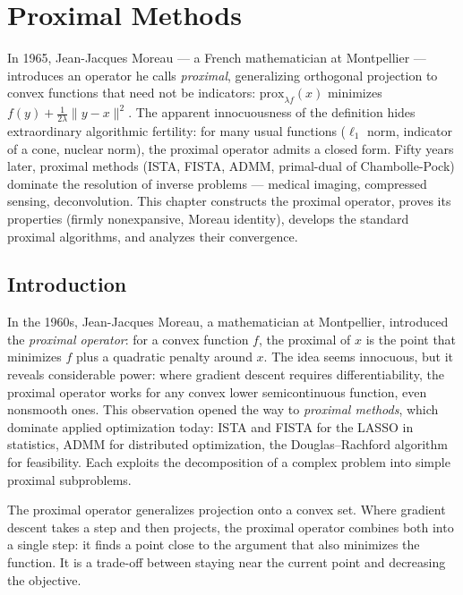 \chapter{Proximal Methods}
\label{ch:proximal}

In 1965, Jean-Jacques Moreau --- a French mathematician at Montpellier --- introduces an operator he calls \emph{proximal}, generalizing orthogonal projection to convex functions that need not be indicators: $\mathrm{prox}_{\lambda f}(x)$ minimizes $f(y) + \frac{1}{2\lambda}\|y - x\|^2$. The apparent innocuousness of the definition hides extraordinary algorithmic fertility: for many usual functions ($\ell_1$ norm, indicator of a cone, nuclear norm), the proximal operator admits a closed form. Fifty years later, proximal methods (ISTA, FISTA, ADMM, primal-dual of Chambolle-Pock) dominate the resolution of inverse problems --- medical imaging, compressed sensing, deconvolution. This chapter constructs the proximal operator, proves its properties (firmly nonexpansive, Moreau identity), develops the standard proximal algorithms, and analyzes their convergence.

\section{Introduction}

In the 1960s, Jean-Jacques Moreau, a mathematician at Montpellier, introduced the \emph{proximal operator}: for a convex function $f$, the proximal of $x$ is the point that minimizes $f$ plus a quadratic penalty around $x$. The idea seems innocuous, but it reveals considerable power: where gradient descent requires differentiability, the proximal operator works for any convex lower semicontinuous function, even nonsmooth ones. This observation opened the way to \emph{proximal methods}, which dominate applied optimization today: ISTA and FISTA for the LASSO in statistics, ADMM for distributed optimization, the Douglas--Rachford algorithm for feasibility. Each exploits the decomposition of a complex problem into simple proximal subproblems.

\begin{intuition}
The proximal operator generalizes projection onto a convex set. Where gradient
descent takes a step and then projects, the proximal operator combines both
into a single step: it finds a point close to the argument that also minimizes
the function. It is a trade-off between staying near the current point and
decreasing the objective.
\end{intuition}

